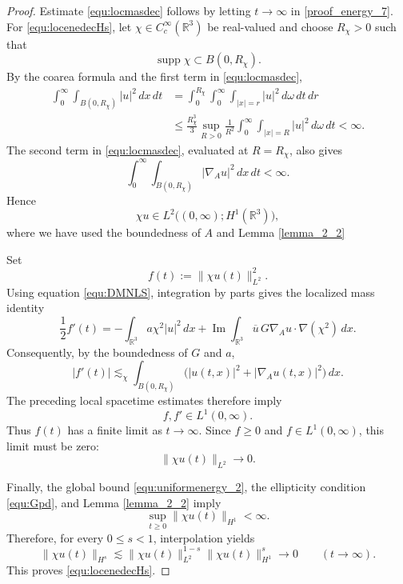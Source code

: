 \documentclass[10pt%
]{amsart}
\numberwithin{equation}{section}
\theoremstyle{definition}
\begin{document}
\begin{proof}
Estimate \eqref{equ:locmasdec} follows by letting $t\to\infty$ in \eqref{proof_energy_7}.
For \eqref{equ:locenedecHs},
let $\chi\in C_c^\infty(\mathbb R^3)$ be real-valued and choose
$R_\chi>0$ such that
\[
\operatorname{supp}\chi\subset B(0,R_\chi).
\]
By the coarea formula and the first term in \eqref{equ:locmasdec},
\[
\begin{aligned}
\int_0^\infty\int_{B(0,R_\chi)}|u|^2\,dx\,dt
&=
\int_0^{R_\chi}
\int_0^\infty\int_{|x|=r}|u|^2\,d\omega\,dt\,dr
\\
&\le
\frac{R_\chi^3}{3}
\sup_{R>0}\frac1{R^2}
\int_0^\infty\int_{|x|=R}|u|^2\,d\omega\,dt
<\infty.
\end{aligned}
\]
The second term in \eqref{equ:locmasdec}, evaluated at $R=R_\chi$, also gives
\[
\int_0^\infty\int_{B(0,R_\chi)}
|\nabla_Au|^2\,dx\,dt<\infty.
\]
Hence
\[
\chi u\in L^2\bigl((0,\infty);H^1(\mathbb R^3)\bigr),
\]
where we have used the boundedness of $A$ and Lemma \ref{lemma_2_2}

Set
\[
f(t):=\|\chi u(t)\|_{L^2}^2.
\]
Using equation \eqref{equ:DMNLS}, integration by parts gives the localized
mass identity
\[
\frac12 f'(t)
=
-\int_{\mathbb R^3}a\chi^2|u|^2\,dx
+
\operatorname{Im}\int_{\mathbb R^3}
\overline u\,G\nabla_Au\cdot\nabla(\chi^2)\,dx.
\]
Consequently, by the boundedness of $G$ and $a$,
\[
|f'(t)|
\lesssim_\chi
\int_{B(0,R_\chi)}
\bigl(|u(t,x)|^2+|\nabla_Au(t,x)|^2\bigr)\,dx.
\]
The preceding local spacetime estimates therefore imply
\[
f,f'\in L^1(0,\infty).
\]
Thus $f(t)$ has a finite limit as $t\to\infty$. Since
$f\ge0$ and $f\in L^1(0,\infty)$, this limit must be zero:
\[
\|\chi u(t)\|_{L^2}\longrightarrow0.
\]

Finally, the global bound \eqref{equ:uniformenergy_2}, the ellipticity condition \eqref{equ:Gpd},
and Lemma \ref{lemma_2_2} imply
\[
\sup_{t\ge0}\|\chi u(t)\|_{H^1}<\infty.
\]
Therefore, for every $0\le s<1$, interpolation yields
\[
\|\chi u(t)\|_{H^s}
\lesssim
\|\chi u(t)\|_{L^2}^{1-s}
\|\chi u(t)\|_{H^1}^{s}
\longrightarrow0
\qquad (t\to\infty).
\]
This proves \eqref{equ:locenedecHs}.
\end{proof}
\end{document}
